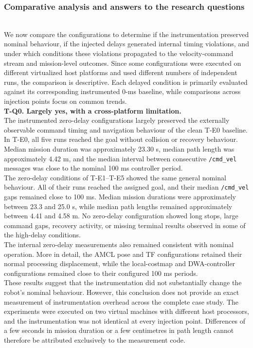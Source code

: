 \noindent \subsubsection{Comparative analysis and answers to the research questions}
\\
We now compare the configurations to determine if the instrumentation preserved nominal behaviour, if the injected delays generated internal timing violations, and under which conditions these violations propagated to the velocity-command stream and mission-level outcomes. Since some configurations were executed on different virtualized host platforms and used different numbers of independent runs, the comparison is descriptive. Each delayed condition is primarily evaluated against its corresponding instrumented 0-ms baseline, while comparisons across injection points focus on common trends.
\\
\noindent \textbf{T-Q0. Largely yes, with a cross-platform limitation.}
\\
The instrumented zero-delay configurations largely preserved the externally observable command timing and navigation behaviour of the clean T-E0 baseline. In T-E0, all five runs reached the goal without collision or recovery behaviour. Median mission duration was approximately 23.30 s, median path length was approximately 4.42 m, and the median interval between consecutive \texttt{/cmd\_vel} messages was close to the nominal 100 ms controller period.
\\
The zero-delay conditions of T-E1--T-E5 showed the same general nominal behaviour. All of their runs reached the assigned goal, and their median \texttt{/cmd\_vel} gaps remained close to 100 ms. Median mission durations were approximately between 23.3 and 25.0 s, while median path lengths remained approximately between 4.41 and 4.58 m. No zero-delay configuration showed long stops, large command gaps, recovery activity, or missing terminal results observed in some of the high-delay conditions.
\\
The internal zero-delay measurements also remained consistent with nominal operation. More in detail, the AMCL pose and TF configurations retained their normal processing displacement, while the local-costmap and DWA-controller configurations remained close to their configured 100 ms periods.
\\
These results suggest that the instrumentation did not substantially change the robot's nominal behaviour.
However, this conclusion does not provide an exact measurement of instrumentation overhead across the complete case study. The experiments were executed on two virtual machines with different host processors, and the instrumentation was not identical at every injection point. Differences of a few seconds in mission duration or a few centimetres in path length cannot therefore be attributed exclusively to the measurement code.
